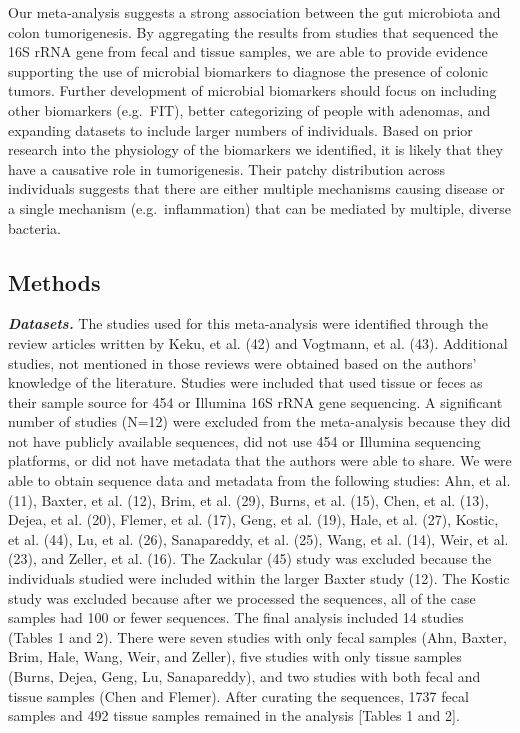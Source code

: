 \documentclass[12pt,]{article}
\begin{document}
Our meta-analysis suggests a strong association between the gut
microbiota and colon tumorigenesis. By aggregating the results from
studies that sequenced the 16S rRNA gene from fecal and tissue samples,
we are able to provide evidence supporting the use of microbial
biomarkers to diagnose the presence of colonic tumors. Further
development of microbial biomarkers should focus on including other
biomarkers (e.g.~FIT), better categorizing of people with adenomas, and
expanding datasets to include larger numbers of individuals. Based on
prior research into the physiology of the biomarkers we identified, it
is likely that they have a causative role in tumorigenesis. Their patchy
distribution across individuals suggests that there are either multiple
mechanisms causing disease or a single mechanism (e.g.~inflammation)
that can be mediated by multiple, diverse bacteria.

\newpage

\subsection{Methods}\label{methods}

\textbf{\emph{Datasets.}} The studies used for this meta-analysis were
identified through the review articles written by Keku, et al. (42) and
Vogtmann, et al. (43). Additional studies, not mentioned in those
reviews were obtained based on the authors' knowledge of the literature.
Studies were included that used tissue or feces as their sample source
for 454 or Illumina 16S rRNA gene sequencing. A significant number of
studies (N=12) were excluded from the meta-analysis because they did not
have publicly available sequences, did not use 454 or Illumina
sequencing platforms, or did not have metadata that the authors were
able to share. We were able to obtain sequence data and metadata from
the following studies: Ahn, et al. (11), Baxter, et al. (12), Brim, et
al. (29), Burns, et al. (15), Chen, et al. (13), Dejea, et al. (20),
Flemer, et al. (17), Geng, et al. (19), Hale, et al. (27), Kostic, et
al. (44), Lu, et al. (26), Sanapareddy, et al. (25), Wang, et al. (14),
Weir, et al. (23), and Zeller, et al. (16). The Zackular (45) study was
excluded because the individuals studied were included within the larger
Baxter study (12). The Kostic study was excluded because after we
processed the sequences, all of the case samples had 100 or fewer
sequences. The final analysis included 14 studies (Tables 1 and 2).
There were seven studies with only fecal samples (Ahn, Baxter, Brim,
Hale, Wang, Weir, and Zeller), five studies with only tissue samples
(Burns, Dejea, Geng, Lu, Sanapareddy), and two studies with both fecal
and tissue samples (Chen and Flemer). After curating the sequences, 1737
fecal samples and 492 tissue samples remained in the analysis {[}Tables
1 and 2{]}.
\end{document}
